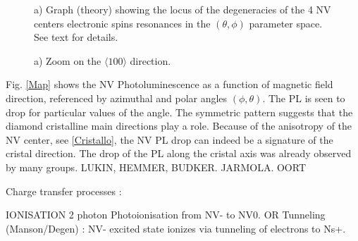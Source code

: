 \documentclass[preprintnumbers,amsmath,amssymb,twocolumn]{revtex4-1}
\begin{document}
\begin{figure}[!ht]
  \caption{a) 
Graph (theory) showing the locus of the degeneracies of the 4 NV centers electronic spins resonances in the $(\theta,\phi)$ parameter space. See text for details.  
 }
\end{figure}

\begin{figure}[!ht]
  \caption{a) 
Zoom on the $\langle 100 \rangle$ direction. 
 }
\end{figure}

Fig. \ref{Map} shows the NV Photoluminescence as a function of magnetic field direction, referenced by azimuthal and polar angles $(\phi, \theta)$. The PL is seen to drop for particular values of the angle. The symmetric pattern suggests that the diamond cristalline main directions play a role. Because of the anisotropy of the NV center, see \ref{Cristallo}, the NV PL drop can indeed be a signature of the cristal direction.
The drop of the PL along the cristal axis was already observed by many groups. LUKIN, HEMMER, BUDKER. JARMOLA. OORT
\cite{van_oort_optically_1991, van_oort_cross-relaxation_1989, armstrong_nvnv_2010, jarmola_longitudinal_2015, akhmedzhanov_microwave-free_2017, akhmedzhanov_magnetometry_2019, holliday_optical_1989, choi_depolarization_2017}

Charge transfer processes : 

IONISATION
2 photon Photoionisation from NV- to NV0.
OR 
Tunneling (Manson/Degen) : NV- excited state ionizes via tunneling of electrons to Ns+.
\end{document}
